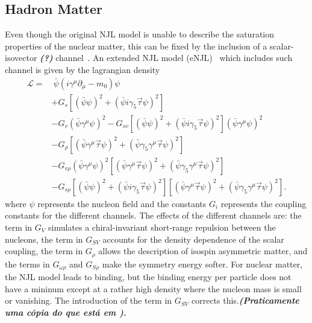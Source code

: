 \documentclass[prc, reprint, amsmath, floatfix, linenumbers,10pt]{revtex4-1}
\newcommand{\comment}[1]{{\bf\textit{#1}}}
\begin{document}
\subsection{Hadron Matter}

Even though the original NJL model is unable to describe the saturation properties of the nuclear matter, this can be fixed by the inclusion of a scalar-isovector \comment{(?)} channel~\cite{Koch1987}. An extended NJL model (eNJL)~\cite{Pais2016} which includes such channel is given by the lagrangian density
\begin{equation}\label{Eq:Lagrangiana_eNLJ_Pais}
\begin{split}
	\mathcal{L} =&~ \bar{\psi}(i\gamma^\mu\partial_\mu - m_0)\psi \\
	& + G_s[(\bar{\psi}\psi)^2 + (\bar{\psi}i\gamma_5\vec{\tau}\psi)^2] \\
	& - G_v(\bar{\psi}\gamma^\mu\psi)^2 - G_{sv}[(\bar{\psi}\psi)^2 + (\bar{\psi}i\gamma_5\vec{\tau}\psi)^2](\bar{\psi}\gamma^\mu\psi)^2 \\
	& - G_\rho[(\bar{\psi}\gamma^\mu\vec{\tau}\psi)^2 + (\bar{\psi}\gamma_5\gamma^\mu\vec{\tau}\psi)^2] \\
	& - G_{v\rho}(\bar{\psi}\gamma^\mu\psi)^2[(\bar{\psi}\gamma^\mu\vec{\tau}\psi)^2 + (\bar{\psi}\gamma_5\gamma^\mu\vec{\tau}\psi)^2] \\
	& - G_{s\rho} [(\bar{\psi}\psi)^2 + (\bar{\psi}i\gamma_5\vec{\tau}\psi)^2][(\bar{\psi}\gamma^\mu\vec{\tau}\psi)^2 + (\bar{\psi}\gamma_5\gamma^\mu\vec{\tau}\psi)^2].
\end{split}
\end{equation}
%
where $\psi$ represents the nucleon field and the constants $G_i$ represents the coupling constants for the different channels. The effects of the different channels are: the term in $G_V$ simulates a chiral-invariant short-range repulsion between the nucleons, the term in $G_{SV}$ accounts for the density dependence of the scalar coupling, the term in $G_\rho$ allows the description of isospin asymmetric matter, and the terms in $G_{\omega\rho}$ and $G_{S\rho}$ make the symmetry energy softer. For nuclear matter, the NJL model leads to binding, but the binding energy per particle does not have a mininum except at a rather high density where the nucleon mass is small or vanishing. The introduction of the term in $G_{SV}$ corrects this.\comment{(Praticamente uma cópia do que está em \cite{Pais2016}).}
\end{document}
